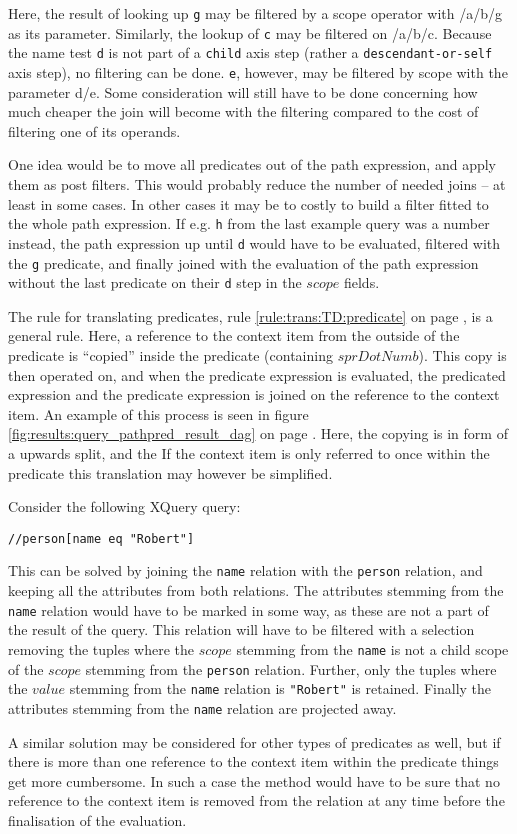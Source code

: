 Here, the result of looking up \texttt{g} may be filtered by a \textsf{scope} operator with \textsf{/a/b/g} as its
parameter. Similarly, the lookup of \texttt{c} may be filtered on \textsf{/a/b/c}. Because the name test \texttt{d}
is not part of a \texttt{child} axis step (rather a \texttt{descendant-or-self} axis step), no filtering can be
done. \texttt{e}, however, may be filtered by \textsf{scope} with the parameter \textsf{d/e}. Some consideration
will still have to be done concerning how much cheaper the join will become with the filtering compared to the cost
of filtering one of its operands.

One idea would be to move all predicates out of the path expression, and apply them as post filters. This would
probably reduce the number of needed joins -- at least in some cases. In other cases it may be to costly to build
a filter fitted to the whole path expression. If e.g. \texttt{h} from the last example query was a number instead,
the path expression up until \texttt{d} would have to be evaluated, filtered with the \texttt{g} predicate, and
finally joined with the evaluation of the path expression without the last predicate on their \texttt{d} step in
the $scope$ fields.

The rule for translating predicates, rule \ref{rule:trans:TD:predicate} on page \pageref{rule:trans:TD:predicate},
is a general rule. Here, a reference to the context item from the outside of the predicate is ``copied'' inside the
predicate (containing $sprDotNumb$). This copy is then operated on, and when the predicate expression is
evaluated, the predicated expression and the predicate expression is joined on the reference to the context item.
An example of this process is seen in figure \ref{fig:results:query_pathpred_result_dag} on page
\pageref{fig:results:query_pathpred_result_dag}. Here, the copying is in form of a upwards split, and the If the
context item is only referred to once within the predicate this translation may however be simplified.

Consider the following XQuery query:
\begin{center}
\texttt{//person[name eq "Robert"]}
\end{center}

This can be solved by joining the \texttt{name} relation with the \texttt{person} relation, and keeping all the
attributes from both relations. The attributes stemming from the \texttt{name} relation would have to be marked in
some way, as these are not a part of the result of the query. This relation will have to be filtered with a
selection removing the tuples where the $scope$ stemming from the \texttt{name} is not a child scope of the
$scope$ stemming from the \texttt{person} relation. Further, only the tuples where the $value$ stemming from the
\texttt{name} relation is \texttt{"Robert"} is retained. Finally the attributes stemming from the \texttt{name}
relation are projected away.

A similar solution may be considered for other types of predicates as well, but if there is more than one
reference to the context item within the predicate things get more cumbersome. In such a case the method would
have to be sure that no reference to the context item is removed from the relation at any time before the
finalisation of the evaluation.